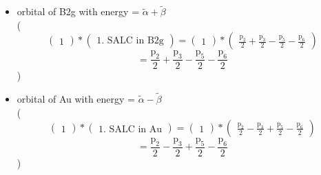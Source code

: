 \documentclass[12pt,a4paper]{article}
\begin{document}
\begin{itemize}
$$ $$ $$ = \frac{4 \tilde{\beta}_{N} \left(\text{p}_{1} - \text{p}_{4}\right) + \left(\tilde{\alpha} - \tilde{\alpha}_{N} - \tilde{\beta} + \sqrt{\tilde{\alpha}^{2} - 2 \tilde{\alpha} \tilde{\alpha}_{N} - 2 \tilde{\alpha} \tilde{\beta} + \tilde{\alpha}_{N}^{2} + 2 \tilde{\alpha}_{N} \tilde{\beta} + \tilde{\beta}^{2} + 8 \tilde{\beta}_{N}^{2}}\right) \left(\text{p}_{2} - \text{p}_{3} - \text{p}_{5} + \text{p}_{6}\right)}{2 \sqrt{8 \left|{\frac{\tilde{\beta}_{N}}{\tilde{\alpha} - \tilde{\alpha}_{N} - \tilde{\beta} + \sqrt{\tilde{\alpha}^{2} - 2 \tilde{\alpha} \tilde{\alpha}_{N} - 2 \tilde{\alpha} \tilde{\beta} + \tilde{\alpha}_{N}^{2} + 2 \tilde{\alpha}_{N} \tilde{\beta} + \tilde{\beta}^{2} + 8 \tilde{\beta}_{N}^{2}}}}\right|^{2} + 1} \left(\tilde{\alpha} - \tilde{\alpha}_{N} - \tilde{\beta} + \sqrt{\tilde{\alpha}^{2} - 2 \tilde{\alpha} \tilde{\alpha}_{N} - 2 \tilde{\alpha} \tilde{\beta} + \tilde{\alpha}_{N}^{2} + 2 \tilde{\alpha}_{N} \tilde{\beta} + \tilde{\beta}^{2} + 8 \tilde{\beta}_{N}^{2}}\right)} 
 $$ 
 )

\item orbital of B2g with energy = 
                                $\tilde{\alpha} + \tilde{\beta}$ \\
( 
$$
\begin{pmatrix}1\end{pmatrix} * \left(\begin{array}{c}\text{1. SALC in B2g}\end{array}\right) = \begin{pmatrix}1\end{pmatrix} * \begin{pmatrix}\frac{\text{p}_{2}}{2} + \frac{\text{p}_{3}}{2} - \frac{\text{p}_{5}}{2} - \frac{\text{p}_{6}}{2}\end{pmatrix} 
 $$ $$ = \frac{\text{p}_{2}}{2} + \frac{\text{p}_{3}}{2} - \frac{\text{p}_{5}}{2} - \frac{\text{p}_{6}}{2} 
 $$ 
 )

\item orbital of Au with energy = 
                                $\tilde{\alpha} - \tilde{\beta}$ \\
( 
$$
\begin{pmatrix}1\end{pmatrix} * \left(\begin{array}{c}\text{1. SALC in Au}\end{array}\right) = \begin{pmatrix}1\end{pmatrix} * \begin{pmatrix}\frac{\text{p}_{2}}{2} - \frac{\text{p}_{3}}{2} + \frac{\text{p}_{5}}{2} - \frac{\text{p}_{6}}{2}\end{pmatrix} 
 $$ $$ = \frac{\text{p}_{2}}{2} - \frac{\text{p}_{3}}{2} + \frac{\text{p}_{5}}{2} - \frac{\text{p}_{6}}{2} 
 $$ 
 )

\end{itemize}
\end{document}
